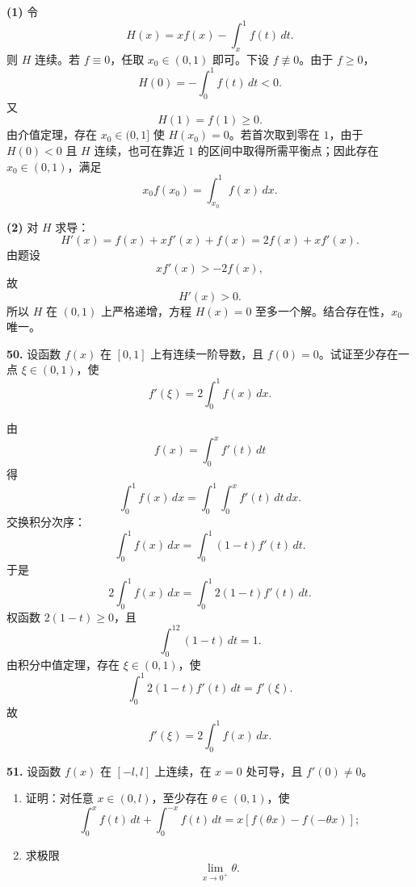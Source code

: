 \begin{solutionblock}
\textbf{(1)} 令
\[
H(x)=xf(x)-\int_x^1f(t)\,dt.
\]
则 \(H\) 连续。若 \(f\equiv0\)，任取 \(x_0\in(0,1)\) 即可。下设 \(f\not\equiv0\)。由于 \(f\ge0\)，
\[
H(0)=-\int_0^1f(t)\,dt<0.
\]
又
\[
H(1)=f(1)\ge0.
\]
由介值定理，存在 \(x_0\in(0,1]\) 使 \(H(x_0)=0\)。若首次取到零在 \(1\)，由于 \(H(0)<0\) 且 \(H\) 连续，也可在靠近 \(1\) 的区间中取得所需平衡点；因此存在 \(x_0\in(0,1)\)，满足
\[
x_0f(x_0)=\int_{x_0}^1f(x)\,dx.
\]

\textbf{(2)} 对 \(H\) 求导：
\[
H'(x)=f(x)+xf'(x)+f(x)=2f(x)+xf'(x).
\]
由题设
\[
xf'(x)>-2f(x),
\]
故
\[
H'(x)>0.
\]
所以 \(H\) 在 \((0,1)\) 上严格递增，方程 \(H(x)=0\) 至多一个解。结合存在性，\(x_0\) 唯一。
\end{solutionblock}

\begin{problemblock}
\textbf{50.} 设函数 \(f(x)\) 在 \([0,1]\) 上有连续一阶导数，且 \(f(0)=0\)。试证至少存在一点 \(\xi\in(0,1)\)，使
\[
f'(\xi)=2\int_0^1f(x)\,dx.
\]
\end{problemblock}

\begin{solutionblock}
由
\[
f(x)=\int_0^x f'(t)\,dt
\]
得
\[
\int_0^1f(x)\,dx
=\int_0^1\int_0^x f'(t)\,dt\,dx.
\]
交换积分次序：
\[
\int_0^1f(x)\,dx
=\int_0^1(1-t)f'(t)\,dt.
\]
于是
\[
2\int_0^1f(x)\,dx
=\int_0^1 2(1-t)f'(t)\,dt.
\]
权函数 \(2(1-t)\ge0\)，且
\[
\int_0^12(1-t)\,dt=1.
\]
由积分中值定理，存在 \(\xi\in(0,1)\)，使
\[
\int_0^1 2(1-t)f'(t)\,dt=f'(\xi).
\]
故
\[
f'(\xi)=2\int_0^1f(x)\,dx.
\]
\end{solutionblock}

\begin{problemblock}
\textbf{51.} 设函数 \(f(x)\) 在 \([-l,l]\) 上连续，在 \(x=0\) 处可导，且 \(f'(0)\ne0\)。
\begin{enumerate}
\item 证明：对任意 \(x\in(0,l)\)，至少存在 \(\theta\in(0,1)\)，使
\[
\int_0^x f(t)\,dt+\int_0^{-x} f(t)\,dt
=x[f(\theta x)-f(-\theta x)];
\]
\item 求极限
\[
\lim_{x\to0^+}\theta.
\]
\end{enumerate}
\end{problemblock}

